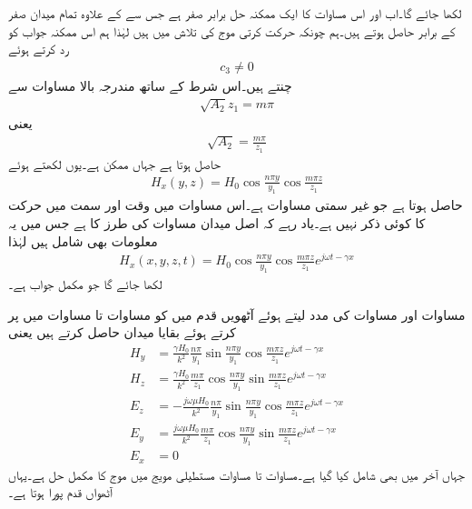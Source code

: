 لکھا جائے گا۔اب   اور اس مساوات کا ایک ممکنہ حل  برابر صفر ہے جس سے  کے علاوہ تمام میدان صفر کے برابر حاصل ہوتے ہیں۔ہم چونکہ حرکت کرتی موج کی تلاش میں ہیں لہٰذا ہم اس ممکنہ جواب کو رد کرتے ہوئے
\begin{align}
c_3 \ne 0
\end{align}
چنتے ہیں۔اس شرط کے ساتھ مندرجہ بالا مساوات سے
\begin{align}
\sqrt{A_2} z_1 = m\pi
\end{align}
یعنی
\begin{align}\label{مساوات_مویج_عمومی_حل_دوسرا_مستقل}
\sqrt{A_2}=\frac{m \pi}{z_1}
\end{align}
حاصل ہوتا ہے جہاں  ممکن ہے۔یوں  لکھتے ہوئے
\begin{align}\label{مساوات_مویج_موج_حل_ث}
H_x(y,z)=H_0 \cos \frac{n \pi y}{y_1}  \cos  \frac{m \pi z}{z_1}
\end{align}
حاصل ہوتا ہے جو غیر سمتی مساوات ہے۔اس مساوات میں وقت  اور  سمت میں حرکت کا کوئی ذکر نہیں ہے۔یاد رہے کہ اصل میدان مساوات  کی طرز کا ہے جس میں یہ معلومات بھی شامل ہیں  لہٰذا
 \begin{align}\label{مساوات_مویج_مکمل_الف}
H_x(x,y,z,t)=H_0 \cos \frac{n \pi y}{y_1}  \cos  \frac{m \pi z}{z_1} e^{j \omega t -\gamma x}
\end{align}
لکھا جائے گا جو مکمل جواب ہے۔

مساوات  اور مساوات  کی مدد لیتے ہوئے آٹھویں قدم میں  کو مساوات  تا مساوات  میں پر کرتے ہوئے بقایا میدان حاصل کرتے ہیں یعنی
\begin{align}
H_y&=\frac{\gamma H_0}{k^2}\frac{n \pi}{y_1} \sin \frac{n\pi y}{y_1} \cos \frac{m \pi z}{z_1} e^{j \omega t -\gamma x} \label{مساوات_مویج_مکمل_ب}\\
H_z&=\frac{\gamma H_0}{k^2}\frac{m \pi}{z_1} \cos \frac{n\pi y}{y_1} \sin \frac{m \pi z}{z_1} e^{j \omega t -\gamma x}\label{مساوات_مویج_مکمل_پ}\\
E_z&=-\frac{j \omega \mu H_0}{k^2}\frac{n \pi}{y_1} \sin \frac{n\pi y}{y_1} \cos \frac{m \pi z}{z_1} e^{j \omega t -\gamma x}\label{مساوات_مویج_مکمل_ت}\\
E_y&=\frac{j \omega \mu H_0}{k^2}\frac{m \pi}{z_1} \cos \frac{n\pi y}{y_1} \sin \frac{m \pi z}{z_1} e^{j \omega t -\gamma x}\label{مساوات_مویج_مکمل_ٹ}\\
E_x&=0 \label{مساوات_مویج_مکمل_ث}
\end{align}
جہاں آخر میں  بھی شامل کیا گیا ہے۔مساوات  تا مساوات  مستطیلی مویج میں  موج کا مکمل حل ہے۔یہاں آٹھواں قدم پورا ہوتا ہے۔

